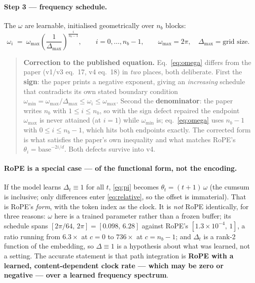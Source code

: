 \documentclass[11pt]{article}
\newcommand{\nb}{n_b}
\begin{document}
\paragraph{Step 3 --- frequency schedule.}
The $\omega$ are learnable, initialised geometrically over $\nb$ blocks:
\begin{equation}
  \label{eq:omega}
  \omega_i \;=\; \omega_{\max}\left(\frac{1}{\Delta_{\max}}\right)^{\frac{i}{\nb-1}},
  \qquad i = 0,\dots,\nb-1,
  \qquad \omega_{\max}=2\pi,\quad \Delta_{\max}=\text{grid size}.
\end{equation}

\begin{quote}\small
\textbf{Correction to the published equation.} Eq.~\eqref{eq:omega} differs from
the paper (v1/v3 eq.~17, v4 eq.~18) in \emph{two} places, both deliberate. First
the \textbf{sign}: the paper prints a negative exponent, giving an \emph{increasing}
schedule that contradicts its own stated boundary condition $\omega_{\min} =
\omega_{\max}/\Delta_{\max} \le \omega_i \le \omega_{\max}$. Second the
\textbf{denominator}: the paper writes $n_b$ with $1 \le i \le n_b$, so with the sign defect repaired the endpoint
$\omega_{\max}$ is never attained (at $i=1$) while $\omega_{\min}$ is; eq.~\eqref{eq:omega} uses $n_b-1$ with
$0 \le i \le n_b-1$, which hits both endpoints exactly. The corrected form is what
satisfies the paper's own inequality and what matches RoPE's
$\theta_i = \text{base}^{-2i/d}$. Both defects survive into v4.
\end{quote}

\paragraph{RoPE is a special case --- of the functional form, not the encoding.}
If the model learns $\Delta_t \equiv 1$ for all $t$, \eqref{eq:pi} becomes
$\theta_t = (t{+}1)\,\omega$ (the cumsum is inclusive; only differences enter
\eqref{eq:relative}, so the offset is immaterial). That is RoPE's \emph{form}, with
the token index as the clock. It is \emph{not} RoPE identically, for three reasons:
$\omega$ here is a trained parameter rather than a frozen buffer; its schedule
spans $[2\pi/64,\,2\pi] = [0.098,\,6.28]$ against RoPE's $[1.3\times10^{-4},\,1]$, a ratio
running from $6.3\times$ at $c=0$ to $736\times$ at $c=\nb-1$; and $\Delta_t$ is a
rank-2 function of the embedding, so $\Delta\equiv 1$ is a hypothesis about what
was learned, not a setting. The accurate statement is that path integration is
\textbf{RoPE with a learned, content-dependent clock rate --- which may be zero or
negative --- over a learned frequency spectrum}.
\end{document}
